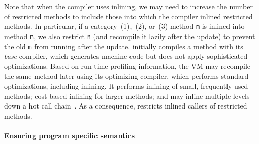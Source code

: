 Note that when the \VM \JIT compiler uses inlining, we may need to
increase the number of restricted methods to include those into which
the compiler inlined restricted methods.
In particular, if a category~(1),~(2),
or~(3) method {\tt m} is inlined into method {\tt n}, we also
restrict {\tt n} (and recompile it lazily after the update) to prevent the old
{\tt m} from running after the update. \RVM initially compiles a method
with its \emph{base}-compiler, which generates machine code but does not
apply sophisticated optimizations. Based on run-time profiling information,
the VM may recompile the same method later using its optimizing compiler,
which performs standard optimizations, including inlining.  It performs
inlining of small, frequently used methods; cost-based inlining for larger
methods; and may inline multiple levels down a hot call
chain~\cite{jalapeno}.  As a
consequence, \JV restricts inlined callers of restricted methods.




\paragraph{Ensuring program specific semantics}

